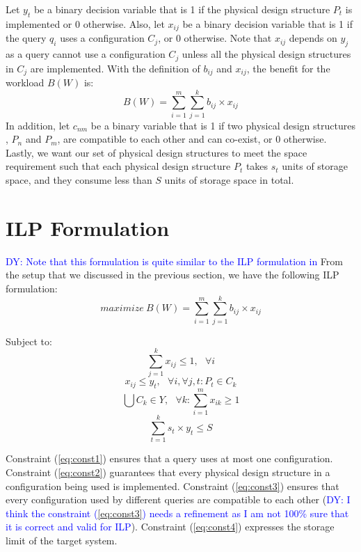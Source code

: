 \documentclass[10pt]{article}
\newcommand{\dy}[1]{\textcolor{blue}{DY: #1}}
\begin{document}
Let $y_t$ be a binary decision variable that is 1 if the physical design structure $P_t$ is
implemented or 0 otherwise.
Also, let $x_{ij}$ be a binary decision variable that is 1 if the query $q_i$ uses a configuration
$C_j$, or 0 otherwise. Note that $x_{ij}$ depends on $y_j$ as a query cannot use a configuration
$C_j$ unless all the physical design structures in $C_j$ are implemented.
With the definition of $b_{ij}$ and $x_{ij}$, the benefit for the workload $B(W)$ is:
\begin{equation}
  B(W) = \sum_{i=1}^{m} \sum_{j=1}^{k} b_{ij} \times x_{ij}
\end{equation}
In addition, let $c_{nm}$ be a binary variable that is 1 if two physical design structures
, $P_n$ and $P_m$, are compatible to each other and can co-exist, or 0 otherwise.
Lastly, we want our set of physical design structures to meet the space requirement such that
each physical design structure $P_t$ takes $s_t$ units of storage space, and
they consume less than $S$ units of storage space in total.

\section{ILP Formulation}
\label{sec:ILP_formulation}

\dy{
Note that this formulation is quite similar to the ILP formulation in
\cite{papadomanolakis2007integer}
}
From the setup that we discussed in the previous section, we have the following ILP formulation:
\begin{equation}
  maximize\ B(W) = \sum_{i=1}^{m} \sum_{j=1}^{k} b_{ij} \times x_{ij}
  \label{eq:obj}
\end{equation}

Subject to:
\begin{equation}
  \sum_{j=1}^{k} x_{ij} \leq 1,~~~\forall{i}
  \label{eq:const1}
\end{equation}
\begin{equation}
  x_{ij} \leq  y_{t},~~~\forall{i}, \forall{j,t} : P_t \in C_k
  \label{eq:const2}
\end{equation}
\begin{equation}
  \bigcup C_{k} \in Y,~~~\forall{k} : \sum_{i=1}^{m} x_{ik} \geq 1
  \label{eq:const3}
\end{equation}
\begin{equation}
  \sum_{t=1}^{k} s_t \times y_t \leq S
  \label{eq:const4}
\end{equation}

Constraint (\ref{eq:const1}) ensures that a query uses at most one configuration.
Constraint (\ref{eq:const2}) guarantees that every physical design structure in a configuration being
used is implemented.
Constraint (\ref{eq:const3}) ensures that every configuration used by different queries are compatible
to each other (\dy{I think the constraint (\ref{eq:const3}) needs a refinement as
I am not 100\% sure that it is correct and valid for ILP}).
Constraint (\ref{eq:const4}) expresses the storage limit of the target system.
\end{document}
